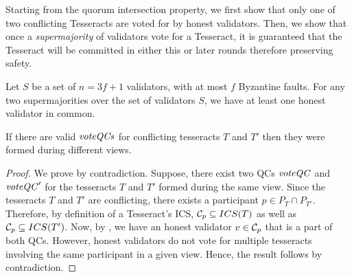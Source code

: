 Starting from the quorum intersection property, we first show that only one of two conflicting Tesseracts are voted for by honest validators. Then, we show that once a \emph{supermajority} of validators vote for a Tesseract, it is guaranteed that the Tesseract will be committed in either this or later rounds therefore preserving safety.


\begin{lemma}\label{lem:qcintersection}
    Let $S$ be a set of $n=3f+1$ validators, with at most $f$ Byzantine faults.
    For any two supermajorities over the set of validators $S$, we have at least one honest validator in common. 
\end{lemma}



\begin{lemma}\label{lem:conflictdiffview}
    If there are valid $\mathit{voteQCs}$ for conflicting tesseracts $T$ and $T'$ then they were formed during different views.
\end{lemma}
\begin{proof}
    We prove by contradiction. 
    Suppose, there exist two QCs $\mathit{voteQC}$ and $\mathit{voteQC}'$ for the tesseracts $T$ and $T'$ formed during the same view.
    Since the tesseracts $T$ and $T'$ are conflicting, there exists a participant $p\in P_T\cap P_{T'}$.
    Therefore, by definition of a Tesseract's ICS, $\mathcal{C}_p\subseteq ICS(T)$ as well as $\mathcal{C}_p\subseteq ICS(T')$. 
    Now, by , we have an honest validator $v\in \mathcal{C}_p$ that is a part of both QCs.
    However, honest validators do not vote for multiple tesseracts involving the same participant in a given view. 
    Hence, the result follows by contradiction.
\end{proof}


